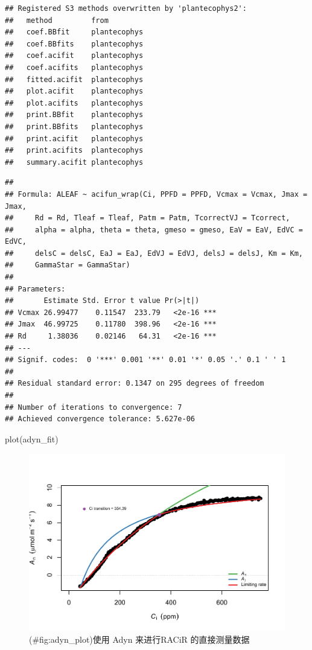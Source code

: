 \documentclass[
]{krantz}
\makeatletter
\newenvironment{Shaded}{\begin{snugshade}}{\end{snugshade}}
\newcommand{\FunctionTok}[1]{\textcolor[rgb]{0.00,0.00,0.00}{#1}}
\newcommand{\NormalTok}[1]{#1}
\newenvironment{kframe}{%
\medskip{}
\setlength{\fboxsep}{.8em}
 \def\at@end@of@kframe{}%
 \ifinner\ifhmode%
  \def\at@end@of@kframe{\end{minipage}}%
  \begin{minipage}{\columnwidth}%
 \fi\fi%
 \def\FrameCommand##1{\hskip\@totalleftmargin \hskip-\fboxsep
 \colorbox{shadecolor}{##1}\hskip-\fboxsep
     \hskip-\linewidth \hskip-\@totalleftmargin \hskip\columnwidth}%
 \MakeFramed {\advance\hsize-\width
   \@totalleftmargin\z@ \linewidth\hsize
   \@setminipage}}%
 {\par\unskip\endMakeFramed%
 \at@end@of@kframe}
\renewenvironment{Shaded}{\begin{kframe}}{\end{kframe}}
\makeatother
\begin{document}
\begin{verbatim}
## Registered S3 methods overwritten by 'plantecophys2':
##   method         from        
##   coef.BBfit     plantecophys
##   coef.BBfits    plantecophys
##   coef.acifit    plantecophys
##   coef.acifits   plantecophys
##   fitted.acifit  plantecophys
##   plot.acifit    plantecophys
##   plot.acifits   plantecophys
##   print.BBfit    plantecophys
##   print.BBfits   plantecophys
##   print.acifit   plantecophys
##   print.acifits  plantecophys
##   summary.acifit plantecophys
\end{verbatim}

\begin{verbatim}
## 
## Formula: ALEAF ~ acifun_wrap(Ci, PPFD = PPFD, Vcmax = Vcmax, Jmax = Jmax, 
##     Rd = Rd, Tleaf = Tleaf, Patm = Patm, TcorrectVJ = Tcorrect, 
##     alpha = alpha, theta = theta, gmeso = gmeso, EaV = EaV, EdVC = EdVC, 
##     delsC = delsC, EaJ = EaJ, EdVJ = EdVJ, delsJ = delsJ, Km = Km, 
##     GammaStar = GammaStar)
## 
## Parameters:
##       Estimate Std. Error t value Pr(>|t|)    
## Vcmax 26.99477    0.11547  233.79   <2e-16 ***
## Jmax  46.99725    0.11780  398.96   <2e-16 ***
## Rd     1.38036    0.02146   64.31   <2e-16 ***
## ---
## Signif. codes:  0 '***' 0.001 '**' 0.01 '*' 0.05 '.' 0.1 ' ' 1
## 
## Residual standard error: 0.1347 on 295 degrees of freedom
## 
## Number of iterations to convergence: 7 
## Achieved convergence tolerance: 5.627e-06
\end{verbatim}

\begin{Shaded}
\begin{Highlighting}[]
\FunctionTok{plot}\NormalTok{(adyn\_fit)}
\end{Highlighting}
\end{Shaded}

\begin{figure}
\centering
\includegraphics{bookdown_files/figure-latex/adyn_plot-1.pdf}
\caption{(\#fig:adyn\_plot)使用 Adyn 来进行RACiR 的直接测量数据}
\end{figure}
\end{document}
